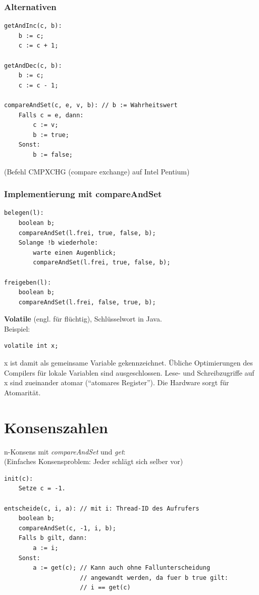 \subsubsection*{Alternativen}

\begin{lstlisting}
getAndInc(c, b):
	b := c;
	c := c + 1;
	
getAndDec(c, b):
	b := c;
	c := c - 1;

compareAndSet(c, e, v, b): // b := Wahrheitswert
	Falls c = e, dann:
		c := v;
		b := true;
	Sonst:
		b := false;
\end{lstlisting}
(Befehl CMPXCHG (compare exchange) auf Intel Pentium)

\subsubsection*{Implementierung mit compareAndSet}

\begin{lstlisting}
belegen(l):
	boolean b;
	compareAndSet(l.frei, true, false, b);
	Solange !b wiederhole:
		warte einen Augenblick;
		compareAndSet(l.frei, true, false, b);

freigeben(l):
	boolean b;
	compareAndSet(l.frei, false, true, b);
\end{lstlisting}

\textbf{Volatile} (engl. für flüchtig), Schlüsselwort in Java.\\
Beispiel:
\begin{lstlisting}
volatile int x;
\end{lstlisting}
x ist damit als gemeinsame Variable gekennzeichnet. Übliche Optimierungen des Compilers für lokale Variablen sind ausgeschlossen. Lese- und Schreibzugriffe auf x sind zueinander atomar ("`atomares Register"'). Die Hardware sorgt für Atomarität.

\section{Konsenszahlen}

n-Konsens mit \emph{compareAndSet} und \emph{get}:\\
(Einfaches Konsensproblem: Jeder schlägt sich selber vor)\\
\begin{lstlisting}
init(c):
    Setze c = -1.

entscheide(c, i, a): // mit i: Thread-ID des Aufrufers
    boolean b;
    compareAndSet(c, -1, i, b);
    Falls b gilt, dann:
        a := i;
    Sonst:
        a := get(c); // Kann auch ohne Fallunterscheidung
                     // angewandt werden, da fuer b true gilt:
                     // i == get(c)
\end{lstlisting}

